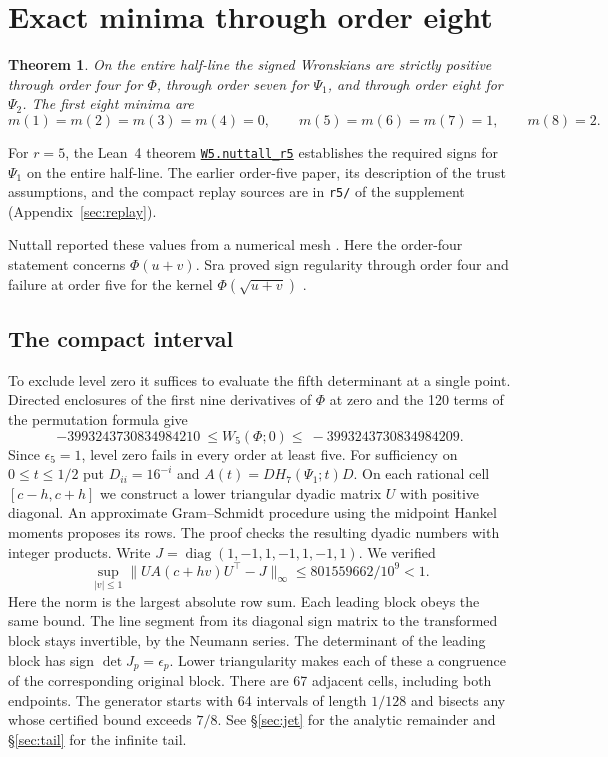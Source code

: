 \documentclass[11pt,a4paper,reqno]{amsart}
\newtheorem{theorem}{Theorem}[section]
\numberwithin{equation}{section}
\begin{document}
\section{Exact minima through order eight}\label{sec:exact}


\begin{theorem}\label{th:exact}
On the entire half-line the signed Wronskians are strictly positive through order four for \(\Phi\), through order seven for \(\Psi_1\), and through order eight for \(\Psi_2\). The first eight minima are
\[m(1)=m(2)=m(3)=m(4)=0,\qquad m(5)=m(6)=m(7)=1,\qquad m(8)=2.\]
\end{theorem}

For \(r=5\), the Lean~4 theorem \href{https://github.com/janchojnacki96-netizen/nuttall-r5-lean-proof/blob/dfaede6d37bb019d97a223d500cbade407e0f994/W5/NuttallR5.lean}{\texttt{W5.nuttall\_r5}} establishes the required signs for \(\Psi_1\) on the entire half-line. The earlier order-five paper, its description of the trust assumptions, and the compact replay sources are in \texttt{r5/} of the supplement (Appendix~\ref{sec:replay}).


Nuttall reported these values from a numerical mesh \cite[\S4.7]{nuttall}. Here the order-four statement concerns \(\Phi(u+v)\). Sra proved sign regularity through order four and failure at order five for the kernel \(\Phi(\sqrt{u+v})\) \cite{sra4}.

\subsection{The compact interval}\label{sec:compact}


To exclude level zero it suffices to evaluate the fifth determinant at a single point. Directed enclosures of the first nine derivatives of \(\Phi\) at zero and the 120 terms of the permutation formula give \[-3993243730834984210\ \le W_5(\Phi;0)\le\ -3993243730834984209.\] Since \(\epsilon_5=1\), level zero fails in every order at least five. For sufficiency on \(0\le t\le1/2\) put \(D_{ii}=16^{-i}\) and \(A(t)=D H_7(\Psi_1;t)D\). On each rational cell \([c-h,c+h]\) we construct a lower triangular dyadic matrix \(U\) with positive diagonal. An approximate Gram--Schmidt procedure using the midpoint Hankel moments proposes its rows. The proof checks the resulting dyadic numbers with integer products. Write \(J=\operatorname{diag}(1,-1,1,-1,1,-1,1)\). We verified 
\begin{equation}\label{eq:cell}
\sup_{|v|\le1}\|U A(c+hv)U^\top-J\|_\infty
 \le 801559662/10^9<1.
\end{equation}
 Here the norm is the largest absolute row sum. Each leading block obeys the same bound. The line segment from its diagonal sign matrix to the transformed block stays invertible, by the Neumann series. The determinant of the leading block has sign \(\det J_p=\epsilon_p\). Lower triangularity makes each of these a congruence of the corresponding original block. There are 67 adjacent cells, including both endpoints. The generator starts with 64 intervals of length \(1/128\) and bisects any whose certified bound exceeds \(7/8\). See \S\ref{sec:jet} for the analytic remainder and \S\ref{sec:tail} for the infinite tail.
\end{document}

